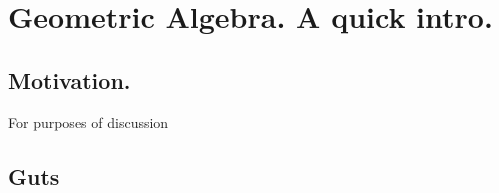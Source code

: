 
%

\chapter{Geometric Algebra.  A quick intro.}
\label{chap:gaQuickIntro}
{}
\date{Mar 16, 2012}

\beginArtWithToc

\section{Motivation.}

For purposes of discussion

\section{Guts}

\EndArticle
